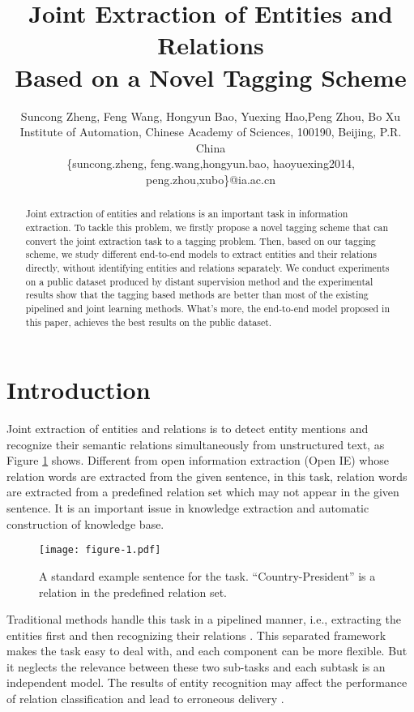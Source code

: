 \documentclass[11pt,a4paper]{article}
\title{Joint Extraction of Entities and Relations \\Based on a Novel Tagging Scheme}
\author{Suncong Zheng, Feng Wang, Hongyun Bao,
Yuexing Hao,Peng Zhou,  Bo Xu
\\Institute of Automation, Chinese Academy of Sciences, 100190, Beijing, P.R. China
\\\{suncong.zheng, feng.wang,hongyun.bao, haoyuexing2014,  peng.zhou,xubo\}@ia.ac.cn}
\date{}
\begin{document}
\maketitle
\begin{abstract}
Joint extraction of entities and relations is an important task in information extraction.
To tackle this problem, we firstly propose a novel tagging scheme
that can convert the joint extraction task to a tagging problem.
Then, based on our tagging scheme, we study different end-to-end models to extract entities and their relations directly,
without identifying entities and relations separately.
We conduct experiments on a public dataset  produced by distant supervision method and
the experimental results show that the tagging based methods are
better than most of the existing pipelined and joint learning methods.
What's more, the end-to-end model proposed in this paper, achieves the best results on the public dataset.
\end{abstract}

\section{Introduction}
\label{sect:introduction}
Joint extraction of entities and relations is to detect entity mentions and
recognize their semantic relations simultaneously from unstructured text, as Figure \ref{exp} shows.
Different from open information extraction (Open IE) \cite{banko2007open} whose relation words are extracted from the given sentence,
in this task, relation words are extracted from a predefined relation set which may not appear in the given sentence.
It is an important issue in knowledge extraction and automatic construction of knowledge base.

\begin{figure}[h]
 \begin{center}
\texttt{[image: figure-1.pdf]}
\caption{\label{exp}A standard example sentence for the task. ``Country-President'' is a relation in the predefined relation set.}
 \end{center}
\end{figure}
Traditional methods handle this task in a
pipelined manner, i.e., extracting the entities \cite{nadeau2007survey}
first and then recognizing their relations \cite{fea2010utd}.
This separated framework makes the task easy to deal with, and each component can be more flexible.
But it neglects the relevance between these two sub-tasks and each subtask is an independent model.
The results of entity recognition may affect the performance of relation classification and lead to erroneous delivery \cite{li2014}.
\end{document}
